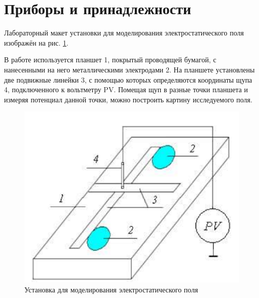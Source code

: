 \section*{Приборы и принадлежности}

Лабораторный макет установки для
моделирования электростатического поля изображён на рис. \ref{fig:unit}.

В работе используется планшет 1, покрытый проводящей бумагой, с
нанесенными на него металлическими электродами 2. На планшете
установлены две подвижные линейки 3, с помощью которых определяются
координаты щупа 4, подключенного к вольтметру PV. Помещая щуп в разные
точки планшета и измеряя потенциал данной точки, можно построить
картину исследуемого поля. 


\begin{figure}[h]
	\centering
	\includegraphics[width=0.6\linewidth]{photo/unit}
	\caption{Установка для моделирования электростатического поля}
	\label{fig:unit}
\end{figure}